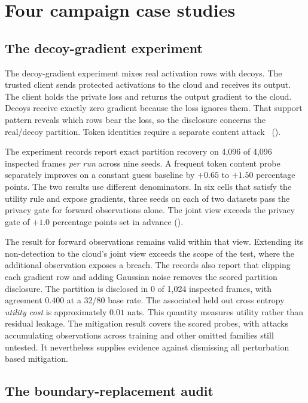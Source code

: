\section{Four campaign case studies}
\label{sec:cases}

\subsection{The decoy-gradient experiment}
\label{sec:f1}

The decoy-gradient experiment mixes real activation rows with decoys.
The trusted client sends protected activations to the cloud and receives
its output. The client holds the private loss and returns the output
gradient to the cloud. Decoys receive exactly zero gradient because the
loss ignores them. That support pattern reveals which rows bear the loss,
so the disclosure concerns the real/decoy partition. Token identities
require a separate content attack~\cite{paper1} ().

The experiment records report exact partition recovery on 4,096 of 4,096
inspected frames \emph{per run} across nine seeds. A frequent token content
probe separately improves on a constant guess baseline by $+0.65$ to
$+1.50$ percentage points. The two results use different denominators.
In six cells that satisfy the utility rule and expose gradients, three
seeds on each of two datasets pass the privacy gate for forward
observations alone. The joint view exceeds the privacy gate of $+1.0$
percentage points set in advance ().

The result for forward observations remains valid within that view.
Extending its non-detection to the cloud's joint view exceeds the scope of
the test, where the additional observation exposes a breach. The records
also report that clipping each gradient row and adding Gaussian noise
removes the scored partition disclosure. The partition is disclosed in
0 of 1,024 inspected frames, with agreement 0.400 at a 32/80 base rate.
The associated held out cross entropy \emph{utility cost} is approximately
$0.01$ nats. This quantity measures utility rather than residual leakage.
The mitigation result covers the scored probes, with attacks accumulating
observations across training and other omitted families still untested.
It nevertheless supplies evidence against dismissing all perturbation
based mitigation.

\subsection{The boundary-replacement audit}
\label{sec:f2}

